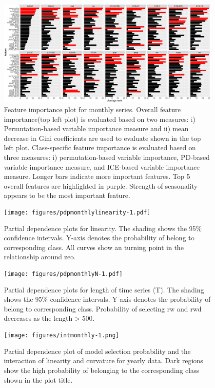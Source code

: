 \documentclass[11pt,a4paper,]{article}
\begin{document}
\begin{figure}
\centering
\includegraphics{figures/vimonthly-1.pdf}
\caption{\label{fig:vimonthly}Feature importance plot for monthly series. Overall feature importance(top left plot) is evaluated based on two measures: i) Permutation-based variable importance measure and ii) mean decrease in Gini coefficients are used to evaluate shown in the top left plot. Class-specific feature importance is evaluated based on three measures: i) permutation-based variable importance, PD-based variable importance measure, and ICE-based variable importance measure. Longer bars indicate more important features. Top 5 overall features are highlighted in purple. Strength of seasonality appears to be the most important feature.}
\end{figure}

\begin{figure}
\centering
\texttt{[image: figures/pdpmonthlylinearity-1.pdf]}
\caption{\label{fig:pdpmonthlylinearity}Partial dependence plots for linearity. The shading shows the 95\% confidence intervals. Y-axis denotes the probability of belong to corresponding class. All curves show an turning point in the relationship around zeo.}
\end{figure}

\begin{figure}
\centering
\texttt{[image: figures/pdpmonthlyN-1.pdf]}
\caption{\label{fig:pdpmonthlyN}Partial dependence plots for length of time series (T). The shading shows the 95\% confidence intervals. Y-axis denotes the probability of belong to corresponding class. Probability of selecting rw and rwd decreases as the length \textgreater{} 500.}
\end{figure}

\begin{figure}
\centering
\texttt{[image: figures/intmonthly-1.png]}
\caption{\label{fig:intmonthly}Partial dependence plot of model selection probability and the interaction of linearity and curvature for yearly data. Dark regions show the high probability of belonging to the corresponding class shown in the plot title.}
\end{figure}
\end{document}
